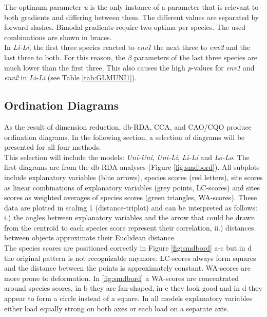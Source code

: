 		\normalsize	
		The optimum parameter \textit{u} is the only instance of a parameter that is relevant to both gradients and differing between them. 
		The different values are separated by forward slashes. 
		Bimodal gradients require two optima per species. 
		The used combinations are shown in braces. \\
		In \textit{Li-Li}, the first three species reacted to \textit{env1} the next three to \textit{env2} and the last three to both.
		For this reason, the $\beta$ parameters of the last three species are much lower than the first three. 
		This also causes the high \textit{p}-values for \textit{env1} and \textit{env2} in \textit{Li-Li} (see Table \ref{tab:GLMUNI1}). 
		
	\subsection{Ordination Diagrams}
	
		As the result of dimension reduction, db-RDA, CCA, and CAO/CQO produce ordination diagrams. 
		In the following section, a selection of diagrams will be presented for all four methods. \\ 
		This selection will include the models: \textit{Uni-Uni}, \textit{Uni-Li}, \textit{Li-Li} and \textit{Lo-Lo}.
		The first diagrams are from the db-RDA analyses (Figure \ref{fig:smdbord}). 
		All subplots include explanatory variables (blue arrows), species scores (red letters), site scores as linear combinations of explanatory variables (grey points, LC-scores) and sites scores as weighted averages of species scores (green triangles, WA-scores).
		These data are plotted in scaling 1 (distance-triplot) and can be interpreted as follows: 
		i.) the angles between explanatory variables and the arrow that could be drawn from the centroid to each species score represent their correlation, %
		ii.) distances between objects approximate their Euclidean distance.\\
		The species scores are positioned correctly in Figure \ref{fig:smdbord} a-c but in d the original pattern is not recognizable anymore. 
		LC-scores always form  squares and the distance between the points is approximately constant. 
		WA-scores are more prone to deformation. 
		In \ref{fig:smdbord} a WA-scores are concentrated around species scores, in b they are fan-shaped, in c they look good and in d they appear to form a circle instead of a square.
		In all models explanatory variables either load equally strong on both axes or each load on a separate axis.
	
